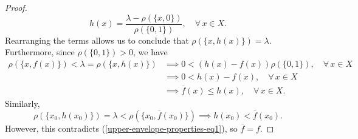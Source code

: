 \documentclass[12pt,a4paper]{amsart}
\theoremstyle{definition}
\begin{document}
\begin{proof}
		\[ h(x) = \frac{\lambda - \rho( \lbrace x, 0 \rbrace)}{\rho (\lbrace0,1\rbrace)}, \quad \forall \, x \in X. \]
		Rearranging the terms allows us to conclude that $\rho (\lbrace x, h(x) \rbrace) = \lambda$. Furthermore, since $\rho (\lbrace 0, 1 \rbrace) > 0$, we have
		\begin{equation}
			\begin{split}
				\label{upper-envelope-properties-eq1}
				\rho( \lbrace x, f(x) \rbrace) < \lambda = \rho(\lbrace x, h(x) \rbrace) &\implies 0 < (h(x)-f(x))\rho(\lbrace 0, 1 \rbrace), \quad \forall \, x \in X \\
				&\implies 0 < h(x)-f(x), \quad \forall \, x \in X   \\
				&\implies \overline{f}(x) \leq h(x), \quad \forall \, x \in X.
			\end{split}
		\end{equation}
		Similarly, 
		\[   \rho(\lbrace x_0, h(x_0) \rbrace) = \lambda <  \rho(\lbrace x_0, \overline{f}(x_0) \rbrace) \implies  h(x_0) < \overline{f}(x_0) . \]
		However, this contradicts  (\ref{upper-envelope-properties-eq1}), so $\overline{f} = f$. 
	\end{proof}
	
\end{document}
